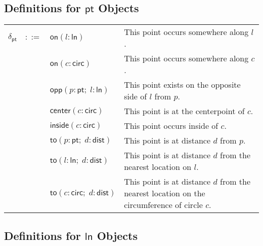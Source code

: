 \documentclass[11pt]{report}
\begin{document}
\subsection{Definitions for $\mathsf{pt}$ Objects}
\label{subsec:def-pt}

\begin{tabularx}{\textwidth}{l l l X}
$\delta_{\mathsf{pt}}$ & $::=$ & $\mathsf{on}(l : \mathsf{ln})$ & This point occurs somewhere along $l$. \\
 & & $\mathsf{on}(c : \mathsf{circ})$ & This point occurs somewhere along $c$. \\
 & & $\mathsf{opp}(p : \mathsf{pt}; \; l : \mathsf{ln})$ & This point exists on the opposite side of $l$ from $p$. \\
 & & $\mathsf{center}(c : \mathsf{circ})$ & This point is at the centerpoint of $c$. \\
 & & $\mathsf{inside}(c : \mathsf{circ})$ & This point occurs inside of $c$. \\
 & & $\mathsf{to}(p : \mathsf{pt}; \; d : \mathsf{dist})$ & This point is at distance $d$ from $p$. \\
 & & $\mathsf{to}(l : \mathsf{ln}; \; d : \mathsf{dist})$ & This point is at distance $d$ from the nearest location on $l$. \\
 & & $\mathsf{to}(c : \mathsf{circ}; \; d : \mathsf{dist})$ & This point is at distance $d$ from the nearest location on the circumference of circle $c$. \\
\end{tabularx}

\subsection{Definitions for $\mathsf{ln}$ Objects}
\label{subsec:def-ln}
\end{document}
